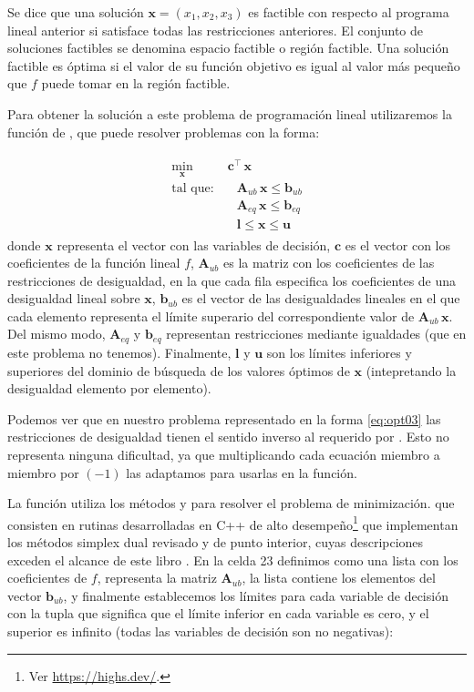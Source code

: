 Se dice que una solución $\bm{x} = (x_1, x_2, x_3)$ es factible con respecto al programa lineal anterior si satisface todas las restricciones anteriores. El conjunto de soluciones factibles se denomina espacio factible o región factible. Una solución factible es óptima si el valor de su función objetivo es igual al valor más pequeño que $f$ puede tomar en la región factible.

Para obtener la solución a este problema de programación lineal utilizaremos la función  de , que puede resolver problemas con la forma:

\begin{align}
 \begin{split}
 \min_{\bm{x}} & \; \bm{c}^{\intercal} \, \bm{x} \\
 \text{tal que:}& \quad \bm{A}_{ub} \, \bm{x} \leq \bm{b}_{ub} \\
 & \quad \bm{A}_{eq} \, \bm{x} \leq \bm{b}_{eq} \\
 & \quad  \bm{l} \leq \bm{x} \leq \bm{u}
 \end{split}
 \label{eq:opt04}
\end{align}
donde $\bm{x}$ representa el vector con las variables de decisión, $\bm{c}$ es el vector con los coeficientes de la función lineal $f$, $\bm{A}_{ub}$ es la matriz con los coeficientes de las restricciones de desigualdad, en la que cada fila especifica los coeficientes de una desigualdad lineal sobre $\bm{x}$, $\bm{b}_{ub}$ es el vector de las desigualdades lineales en el que cada elemento representa el límite superario del correspondiente valor de $\bm{A}_{ub} \, \bm{x}$. Del mismo modo, $\bm{A}_{eq}$ y $\bm{b}_{eq}$ representan restricciones mediante igualdades (que en este problema no tenemos). Finalmente, $\bm{l}$ y $\bm{u}$ son los límites inferiores y superiores del dominio de búsqueda de los valores óptimos de $\bm{x}$ (intepretando la desigualdad elemento por elemento).

Podemos ver que en nuestro problema representado en la forma \eqref{eq:opt03} las restricciones de desigualdad tienen el sentido inverso al requerido por . Esto no representa ninguna dificultad, ya que multiplicando cada ecuación miembro a miembro por $(-1)$ las adaptamos para usarlas en la función. 

La función  utiliza los métodos  y  para resolver el problema de minimización. que consisten en rutinas desarrolladas en C++ de alto desempeño\footnote{Ver \url{https://highs.dev/}.} que implementan los métodos simplex dual revisado y de punto interior, cuyas descripciones exceden el alcance de este libro \cite{huangfu2018}. En la celda 23 definimos  como una lista con los coeficientes de $f$,  representa la matriz $\bm{A}_{ub}$, la lista  contiene los elementos del vector $\bm{b}_{ub}$, y finalmente establecemos los límites para cada variable de decisión con la tupla  que significa que el límite inferior en cada variable es cero, y el superior es infinito (todas las variables de decisión son no negativas):

